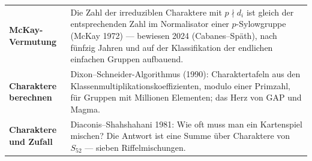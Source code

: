 \begin{forschung}
\begin{center}
{\small
\renewcommand{\arraystretch}{1.45}
\begin{tabular}{@{}P{3.0cm}P{5.2cm}@{}}
\toprule
\textbf{McKay-Vermutung} & Die Zahl der irreduziblen Charaktere mit $p\nmid d_i$ ist gleich der entsprechenden Zahl im Normalisator einer $p$-Sylowgruppe (McKay 1972) --- bewiesen 2024 (Cabanes--Späth), nach fünfzig Jahren und auf der Klassifikation der endlichen einfachen Gruppen aufbauend.\\
\textbf{Charaktere berechnen} & Dixon--Schneider-Algorithmus (1990): Charaktertafeln aus den Klassenmultiplikationskoeffizienten, modulo einer Primzahl, für Gruppen mit Millionen Elementen; das Herz von GAP und Magma.\\
\textbf{Charaktere und Zufall} & Diaconis--Shahshahani 1981: Wie oft muss man ein Kartenspiel mischen? Die Antwort ist eine Summe über Charaktere von $S_{52}$ --- sieben Riffelmischungen.\\
\bottomrule
\end{tabular}}
\end{center}

\begin{center}
\begin{minipage}{0.88\textwidth}
\end{minipage}
\end{center}
\end{forschung}

